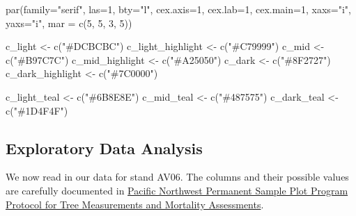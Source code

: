 \documentclass[
  letterpaper,
  DIV=11,
  numbers=noendperiod]{scrartcl}
\newenvironment{Shaded}{\begin{snugshade}}{\end{snugshade}}
\newcommand{\AttributeTok}[1]{\textcolor[rgb]{0.40,0.45,0.13}{#1}}
\newcommand{\DecValTok}[1]{\textcolor[rgb]{0.68,0.00,0.00}{#1}}
\newcommand{\FunctionTok}[1]{\textcolor[rgb]{0.28,0.35,0.67}{#1}}
\newcommand{\NormalTok}[1]{\textcolor[rgb]{0.00,0.23,0.31}{#1}}
\newcommand{\OtherTok}[1]{\textcolor[rgb]{0.00,0.23,0.31}{#1}}
\newcommand{\StringTok}[1]{\textcolor[rgb]{0.13,0.47,0.30}{#1}}
\begin{document}
\begin{Shaded}
\begin{Highlighting}[]
\FunctionTok{par}\NormalTok{(}\AttributeTok{family=}\StringTok{"serif"}\NormalTok{, }\AttributeTok{las=}\DecValTok{1}\NormalTok{, }\AttributeTok{bty=}\StringTok{"l"}\NormalTok{,}
    \AttributeTok{cex.axis=}\DecValTok{1}\NormalTok{, }\AttributeTok{cex.lab=}\DecValTok{1}\NormalTok{, }\AttributeTok{cex.main=}\DecValTok{1}\NormalTok{,}
    \AttributeTok{xaxs=}\StringTok{"i"}\NormalTok{, }\AttributeTok{yaxs=}\StringTok{"i"}\NormalTok{, }\AttributeTok{mar =} \FunctionTok{c}\NormalTok{(}\DecValTok{5}\NormalTok{, }\DecValTok{5}\NormalTok{, }\DecValTok{3}\NormalTok{, }\DecValTok{5}\NormalTok{))}

\NormalTok{c\_light }\OtherTok{\textless{}{-}} \FunctionTok{c}\NormalTok{(}\StringTok{"\#DCBCBC"}\NormalTok{)}
\NormalTok{c\_light\_highlight }\OtherTok{\textless{}{-}} \FunctionTok{c}\NormalTok{(}\StringTok{"\#C79999"}\NormalTok{)}
\NormalTok{c\_mid }\OtherTok{\textless{}{-}} \FunctionTok{c}\NormalTok{(}\StringTok{"\#B97C7C"}\NormalTok{)}
\NormalTok{c\_mid\_highlight }\OtherTok{\textless{}{-}} \FunctionTok{c}\NormalTok{(}\StringTok{"\#A25050"}\NormalTok{)}
\NormalTok{c\_dark }\OtherTok{\textless{}{-}} \FunctionTok{c}\NormalTok{(}\StringTok{"\#8F2727"}\NormalTok{)}
\NormalTok{c\_dark\_highlight }\OtherTok{\textless{}{-}} \FunctionTok{c}\NormalTok{(}\StringTok{"\#7C0000"}\NormalTok{)}

\NormalTok{c\_light\_teal }\OtherTok{\textless{}{-}} \FunctionTok{c}\NormalTok{(}\StringTok{"\#6B8E8E"}\NormalTok{)}
\NormalTok{c\_mid\_teal }\OtherTok{\textless{}{-}} \FunctionTok{c}\NormalTok{(}\StringTok{"\#487575"}\NormalTok{)}
\NormalTok{c\_dark\_teal }\OtherTok{\textless{}{-}} \FunctionTok{c}\NormalTok{(}\StringTok{"\#1D4F4F"}\NormalTok{)}
\end{Highlighting}
\end{Shaded}

\hypertarget{sec:eda}{%
\subsection{Exploratory Data Analysis}\label{sec:eda}}

We now read in our data for stand AV06. The columns and their possible
values are carefully documented in
\href{https://github.com/lizzieinvancouver/bayesian2024ubc/tree/main/data/treestands/metadata/PSP_tree_measurement_protocol_v2019.pdf}{Pacific
Northwest Permanent Sample Plot Program Protocol for Tree Measurements
and Mortality Assessments}.
\end{document}
